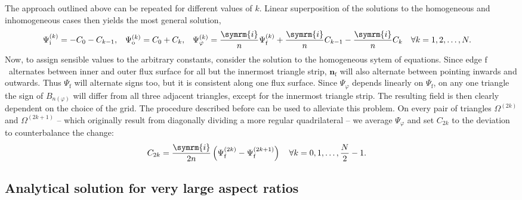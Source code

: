 \documentclass[a4paper, twoside, 10pt, english]{article}
\numberwithin{equation}{section}
\let\temp\varrho
\let\varrho\rho
\let\rho\temp
\let\temp\vartheta
\let\vartheta\theta
\let\theta\temp
\let\temp\varphi
\let\varphi\phi
\let\phi\temp
\let\vec\symbf
\newcommand*\im{\ensuremath{\symrm{i}}}  %
\newcommand*\fs{\ensuremath{\textrm{f}}}  %
\newcommand*\inw{\ensuremath{\textrm{i}}}  %
\newcommand*\out{\ensuremath{\textrm{o}}}  %
\begin{document}
The approach outlined above can be repeated for different values of $k$. Linear superposition of the solutions to the homogeneous and inhomogeneous cases then yields the most general solution,
\begin{align}
  \Psi_{\inw}^{(k)} &= -C_{0} - C_{k-1}, & \Psi_{\out}^{(k)} &= C_{0} + C_{k}, & \Psi_{\phi}^{(k)} &= \frac{\im}{n} \Psi_{\fs}^{(k)} + \frac{\im}{n} C_{k-1} - \frac{\im}{n} C_{k} \quad \forall k = 1, 2, \dotsc, N.
\end{align}
Now, to assign sensible values to the arbitrary constants, consider the solution to the homogeneous sytem of equations. Since edge \fs\ alternates between inner and outer flux surface for all but the innermost triangle strip, $\vec{n}_{\fs}$ will also alternate between pointing inwards and outwards. Thus $\Psi_{\fs}$ will alternate signs too, but it is consistent along one flux surface. Since $\Psi_{\phi}$ depends linearly on $\Psi_{\fs}$, on any one triangle the sign of $B_{n (\phi)}$ will differ from all three adjacent triangles, except for the innermost triangle strip. The resulting field is then clearly dependent on the choice of the grid. The procedure described before can be used to alleviate this problem. On every pair of triangles $\Omega^{(2k)}$ and $\Omega^{(2k+1)}$ -- which originally result from diagonally dividing a more regular quadrilateral -- we average $\Psi_{\phi}$ and set $C_{2k}$ to the deviation to counterbalance the change:
\begin{align}
  C_{2k} &= \frac{\im}{2 n} \left( \Psi_{\fs}^{(2k)} - \Psi_{\fs}^{(2k+1)} \right) \quad \forall k = 0, 1, \dotsc, \frac{N}{2} - 1.
\end{align}

\subsection{Analytical solution for very large aspect ratios}
\label{sec:analytical}
\end{document}
